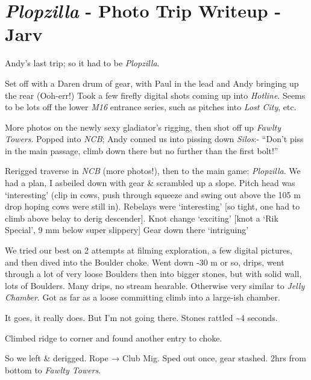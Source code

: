 \section{\texorpdfstring{\emph{Plopzilla} - Photo Trip Writeup -
Jarv}{Plopzilla - Photo Trip Writeup - Jarv}}

Andy's last trip; so it had to be \emph{Plopzilla}.

Set off with a Daren drum of gear, with Paul in the lead and Andy
bringing up the rear (Ooh-err!) Took a few firefly digital shots coming
up into \emph{Hotline}. Seems to be lots off the lower \emph{M16}
entrance series, such as pitches into \emph{Lost City}, etc.

More photos on the newly sexy gladiator's rigging, then shot off up
\emph{Fawlty Towers}. Popped into \emph{NCB}; Andy conned us into
pissing down \emph{Silos}:- ``Don't piss in the main passage, climb down
there but no further than the first bolt!''

Rerigged traverse in \emph{NCB} (more photos!), then to the main game:
\emph{Plopzilla}. We had a plan, I asbeiled down with gear \& scrambled
up a slope. Pitch head was `interesting' (clip in cows, push through
squeeze and swing out above the 105 m drop hoping cows were still in).
Rebelays were `interesting' {[}so tight, one had to climb above belay to
derig descender{]}. Knot change `exciting' {[}knot a `Rik Special', 9 mm
below super slippery{]} Gear down there `intriguing'

We tried our best on 2 attempts at filming exploration, a few digital
pictures, and then dived into the Boulder choke. Went down -30 m or so,
drips, went through a lot of very loose Boulders then into bigger
stones, but with solid wall, lots of Boulders. Many drips, no stream
hearable. Otherwise very similar to \emph{Jelly Chamber}. Got as far as
a loose committing climb into a large-ish chamber.

It goes, it really does. But I'm not going there. Stones rattled
\textasciitilde 4 seconds.

Climbed ridge to corner and found another entry to choke.

So we left \& derigged. Rope → Club Mig. Sped out once, gear stashed.
2hrs from bottom to \emph{Fawlty Towers}.


